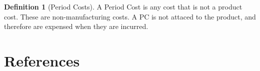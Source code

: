\documentclass[12pt]{report}
\numberwithin{equation}{chapter}
\theoremstyle{definition}
\newtheorem{definition}{Definition}[chapter]
\theoremstyle{plain}
\theoremstyle{remark}
\begin{document}
\begin{definition}[Period Costs]
    A Period Cost is any cost that is not a product cost. These are non-manufacturing costs.
    A PC is not attaced to the product, and therefore are expensed when they are incurred.
\end{definition}

\chapter*{References}
\printbibliography
\end{document}
